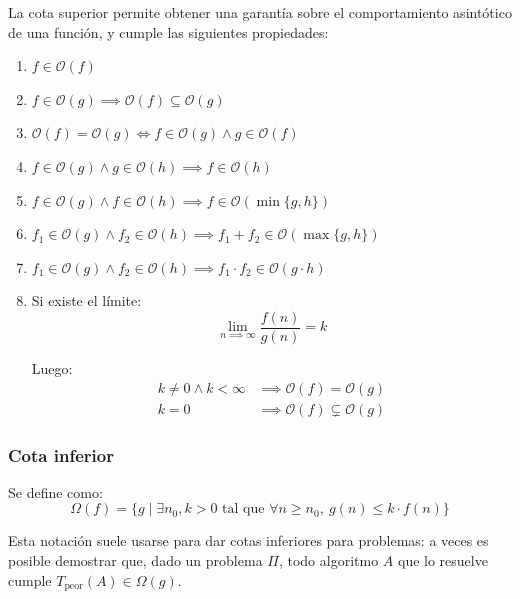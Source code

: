 \documentclass{article}
\newcommand{\BigO}[1]{{\mathcal{O}(#1)}}
\newcommand{\BigOmega}[1]{{\Omega(#1)}}
\begin{document}
La cota superior permite obtener una garantía sobre el comportamiento asintótico de una función, y cumple las siguientes propiedades:
\begin{enumerate}
    \item $f \in \BigO{f}$
    \item $f \in \BigO{g} \implies \BigO{f} \subseteq \BigO{g}$
    \item $\BigO{f} = \BigO{g} \iff f \in \BigO{g} \land g \in \BigO{f}$
    \item $f \in \BigO{g} \land g \in \BigO{h} \implies f \in \BigO{h}$
    \item $f \in \BigO{g} \land f \in \BigO{h} \implies f \in \BigO{\min{\{g, h\}}}$
    \item $f_1 \in \BigO{g} \land f_2 \in \BigO{h} \implies f_1 + f_2 \in \BigO{\max{\{g, h\}}}$
    \item $f_1 \in \BigO{g} \land f_2 \in \BigO{h} \implies f_1 \cdot f_2 \in \BigO{g \cdot h}$
    \item Si existe el límite:
          $$\lim_{n \implies \infty} \frac{f(n)}{g(n)} = k$$

          Luego:
          \begin{align*}
              k \neq 0 \land k < \infty & \implies \BigO{f} = \BigO{g}          \\
              k = 0                     & \implies \BigO{f} \subsetneq \BigO{g}
          \end{align*}
\end{enumerate}

\subsubsection{Cota inferior}

Se define como:
$$\BigOmega{f} = \{ g \mid \exists n_0, k > 0 \text{ tal que } \forall n \geq n_0,\ g(n) \leq k \cdot f(n) \}$$

Esta notación suele usarse para dar cotas inferiores para problemas: a veces es posible demostrar que, dado un problema $\Pi$, todo algoritmo $A$ que lo resuelve cumple $T_{\text{peor}}(A) \in \BigOmega{g}$.
\end{document}
